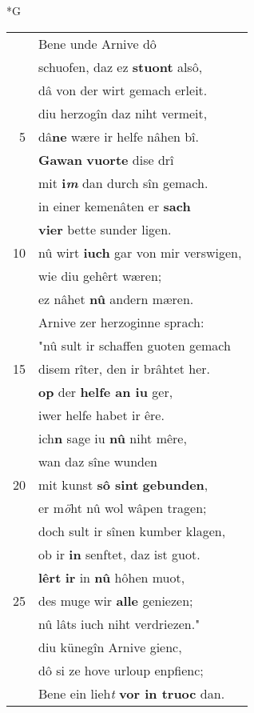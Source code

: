 \documentclass[8pt,a4paper,notitlepage]{article}
\begin{document}
\begin{table}[ht]
\begin{minipage}[t]{0.5\linewidth}
\small
\begin{center}*G
\end{center}
\begin{tabular}{rl}
 & Bene unde Arnive dô\\ 
 & schuofen, daz ez \textbf{stuont} alsô,\\ 
 & dâ von der wirt gemach erleit.\\ 
 & diu herzogîn daz niht vermeit,\\ 
5 & dâ\textbf{ne} wære ir helfe nâhen bî.\\ 
 & \textbf{Gawan} \textbf{vuorte} dise drî\\ 
 & mit \textbf{i\textit{m}} dan durch sîn gemach.\\ 
 & in einer kemenâten er \textbf{sach}\\ 
 & \textbf{vier} bette sunder ligen.\\ 
10 & nû wirt \textbf{iuch} gar von mir verswigen,\\ 
 & wie diu gehêrt wæren;\\ 
 & ez nâhet \textbf{nû} andern mæren.\\ 
 & Arnive zer herzoginne sprach:\\ 
 & "nû sult ir schaffen guoten gemach\\ 
15 & disem rîter, den ir brâhtet her.\\ 
 & \textbf{op} der \textbf{helfe an iu} ger,\\ 
 & iwer helfe habet ir êre.\\ 
 & ich\textbf{n} sage iu \textbf{nû} niht mêre,\\ 
 & wan daz sîne wunden\\ 
20 & mit kunst \textbf{sô sint} \textbf{gebunden},\\ 
 & er m\textit{ö}ht nû wol wâpen tragen;\\ 
 & doch sult ir sînen kumber klagen,\\ 
 & ob ir \textbf{in} senftet, daz ist guot.\\ 
 & \textbf{lêrt} \textbf{ir} in \textbf{nû} hôhen muot,\\ 
25 & des muge wir \textbf{alle} geniezen;\\ 
 & nû lâts iuch niht verdriezen."\\ 
 & diu künegîn Arnive gienc,\\ 
 & dô si ze hove urloup enpfienc;\\ 
 & Bene ein lieh\textit{t} \textbf{vor in truoc} dan.\\ 

\end{tabular}
\end{minipage}
\end{table}
\end{document}
